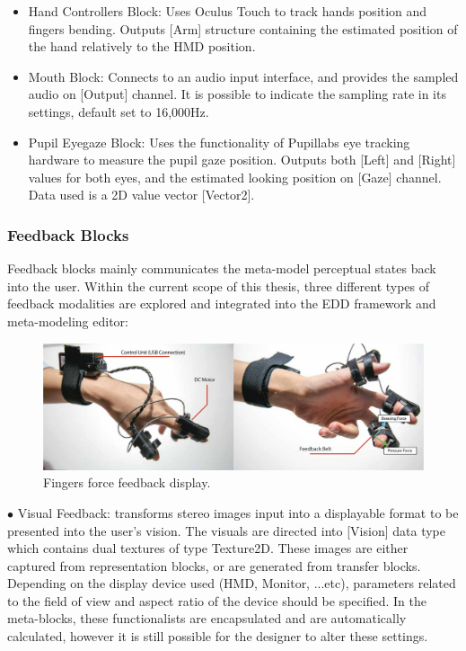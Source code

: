 \begin{itemize}
\item Hand Controllers Block: Uses Oculus Touch to track hands position and fingers bending. Outputs [Arm] structure containing the estimated position of the hand relatively to the HMD position.

\item Mouth Block: Connects to an audio input interface, and provides the sampled audio on [Output] channel. It is possible to indicate the sampling rate in its settings, default set to 16,000Hz.

\item Pupil Eyegaze Block: Uses the functionality of Pupillabs eye tracking hardware to measure the pupil gaze position. Outputs both [Left] and [Right] values for both eyes, and the estimated looking position on [Gaze] channel. Data used is a 2D value vector [Vector2].

\end{itemize}




\subsubsection{Feedback Blocks}


Feedback blocks mainly communicates the meta-model perceptual states back into the user. Within the current scope of this thesis, three different types of feedback modalities are explored and integrated into the EDD framework and meta-modeling editor:


\begin{figure}[b]
\centering
\captionsetup{justification=centering} 
\includegraphics[width=1\textwidth]{figures/system/GGDisplay.pdf}
\caption{Fingers force feedback display.}
  \label{fig:system-GGDisplay}
\end{figure}

$\bullet$ Visual Feedback: transforms stereo images input into a displayable format to be presented into the user's vision. The visuals are directed into [Vision] data type which contains dual textures of type Texture2D. These images are either captured from representation blocks, or are generated from transfer blocks. Depending on the display device used (HMD, Monitor, ...etc), parameters related to the field of view and aspect ratio of the device should be specified. In the meta-blocks, these functionalists are encapsulated and are automatically calculated, however it is still possible for the designer to alter these settings.


